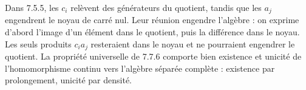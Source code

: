 Dans 7.5.5, les $c_i$ relèvent des générateurs du quotient, tandis
que les $a_j$ engendrent le noyau de carré nul. Leur réunion engendre
l'algèbre : on exprime d'abord l'image d'un élément dans le quotient,
puis la différence dans le noyau. Les seuls produits $c_ia_j$
resteraient dans le noyau et ne pourraient engendrer le quotient.
La propriété universelle de 7.7.6 comporte bien existence et unicité
de l'homomorphisme continu vers l'algèbre séparée complète : existence
par prolongement, unicité par densité.
\par
